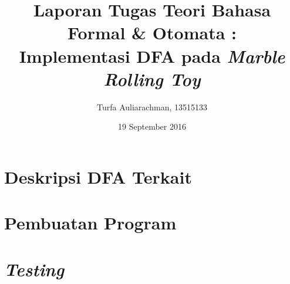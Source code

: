\documentclass[12pt]{report}
\title{Laporan Tugas Teori Bahasa Formal \& Otomata :\\ Implementasi DFA pada \textit{Marble Rolling Toy}}
\author{Turfa Auliarachman, 13515133}
\date{19 September 2016}
\begin{document}
  \maketitle
  \newpage
  \chapter{Deskripsi DFA Terkait}
  
  
  \chapter{Pembuatan Program}
  
  
  
  \chapter{\textit{Testing}}
  
\end{document}
